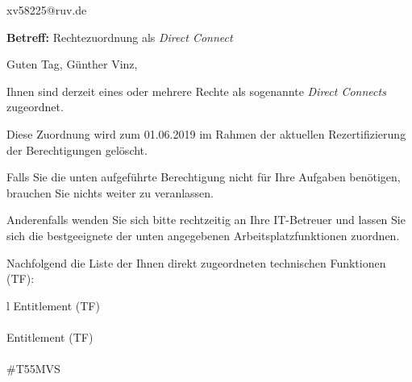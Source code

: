 \documentclass[a4paper,landscape,12pt]{letter}
\begin{document}
\begin{letter}{xv58225@ruv.de\hfill \break}
\begin{normalsize}
	\opening{\textbf{Betreff:} Rechtezuordnung als \emph{Direct Connect}}
	\begin{normalsize} \hfill
	\end{normalsize}

	\begin{normalsize}
		Guten Tag, 
	Günther Vinz, \hfill \break
	\end{normalsize}
	\end{normalsize}
	
\begin{normalsize}
	Ihnen sind derzeit eines oder mehrere Rechte als sogenannte \emph{Direct Connects} zugeordnet.
	
	Diese Zuordnung wird zum 01.06.2019 im Rahmen der aktuellen Rezertifizierung der Berechtigungen gelöscht.
	
	Falls Sie die unten aufgeführte Berechtigung nicht für Ihre Aufgaben benötigen, 
	brauchen Sie nichts weiter zu veranlassen.
	
	Anderenfalls wenden Sie sich bitte rechtzeitig an Ihre IT-Betreuer 
	und lassen Sie sich die bestgeeignete der unten angegebenen Arbeitsplatzfunktionen zuordnen.
	\end{normalsize}
	
\begin{normalsize}
	Nachfolgend die Liste der Ihnen direkt zugeordneten technischen Funktionen (TF):

	\begin{longtable}{l}
		Entitlement (TF) \\ \hline
		\endfirsthead
		\\\hline
		Entitlement (TF) \\ \hline
		\endhead %
		\multicolumn{1}{r@{}}{Fortsetzung \ldots}\\
		\endfoot
		\hline
		\endlastfoot
	\#T55MVS\\
	\end{longtable}
	\end{normalsize}
	

\end{letter}
\end{document}
